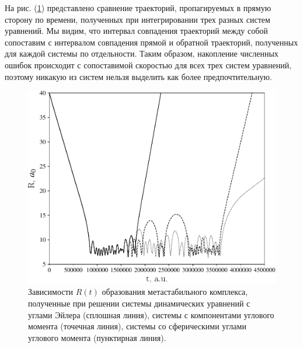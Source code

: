 На рис. (\ref{fig:trajectory-comparison}) представлено сравнение траекторий, пропагируемых в прямую сторону по времени, полученных при интегрировании трех разных систем уравнений. Мы видим, что интервал совпадения траекторий между собой сопоставим с интервалом совпадения прямой и обратной траекторий, полученных для каждой системы по отдельности. Таким образом, накопление численных ошибок происходит с сопоставимой скоростью для всех трех систем уравнений, поэтому никакую из систем нельзя выделить как более предпочтительную. \par

\begin{figure}[H]
    \centering
    \includegraphics[width=0.75\linewidth]{./pictures/trajectories/trajectory-comparison-crop.pdf}
    \caption{Зависимости $R(t)$ образования метастабильного комплекса, полученные при решении системы динамических уравнений с углами Эйлера (сплошная линия), системы с компонентами углового момента (точечная линия), системы со сферическими углами углового момента (пунктирная линия).}
    \label{fig:trajectory-comparison}
\end{figure}

